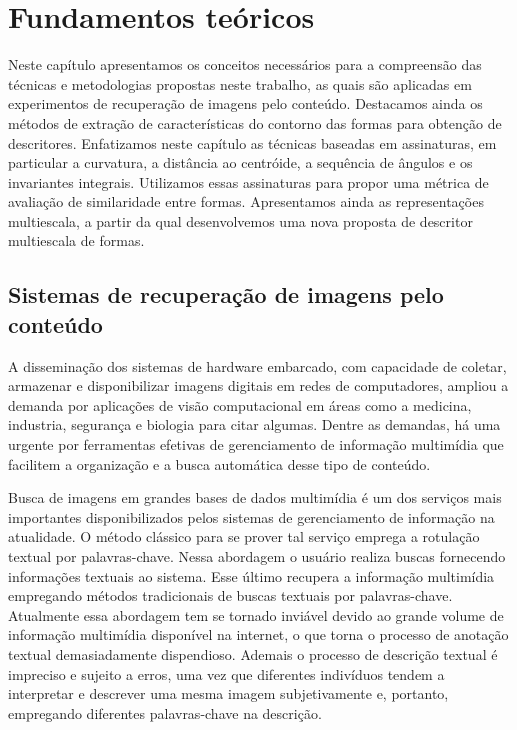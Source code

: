 
\chapter{Fundamentos teóricos\label{chap:ch1}}

Neste capítulo apresentamos os conceitos necessários para a compreensão das técnicas e metodologias propostas neste trabalho, as quais são aplicadas em experimentos de recuperação de imagens pelo conteúdo. Destacamos ainda os métodos de extração de características do contorno das formas para obtenção de descritores. Enfatizamos neste capítulo as técnicas baseadas em assinaturas, em particular a curvatura, a distância ao centróide, a sequência de ângulos e os invariantes integrais. Utilizamos essas assinaturas para propor uma métrica de avaliação de similaridade entre formas. Apresentamos ainda as representações multiescala, a partir da qual desenvolvemos uma nova proposta de descritor multiescala de formas.


\section{\label{chap:CBIR} Sistemas de recuperação de imagens pelo conteúdo}

A disseminação dos sistemas de hardware embarcado, com capacidade de coletar, armazenar e disponibilizar imagens digitais em redes de computadores, ampliou a demanda por aplicações de visão computacional em áreas como a medicina, industria, segurança e biologia para citar algumas. Dentre as demandas, há uma urgente por ferramentas efetivas de gerenciamento de informação multimídia que facilitem a organização e a busca automática desse tipo de conteúdo. 

Busca de imagens em grandes bases de dados multimídia é um dos serviços mais importantes disponibilizados pelos sistemas de gerenciamento de informação na atualidade. O método clássico para se prover tal serviço emprega a rotulação textual por palavras-chave. Nessa abordagem o usuário realiza buscas fornecendo informações textuais ao sistema. Esse último recupera a informação multimídia empregando métodos tradicionais de buscas textuais por palavras-chave. Atualmente essa abordagem tem se tornado inviável devido ao grande volume de informação multimídia disponível na internet, o que torna o processo de anotação textual demasiadamente dispendioso. Ademais o processo de descrição textual é impreciso e sujeito a erros, uma vez que diferentes indivíduos tendem a interpretar e descrever uma mesma imagem subjetivamente e, portanto, empregando diferentes palavras-chave na descrição.

